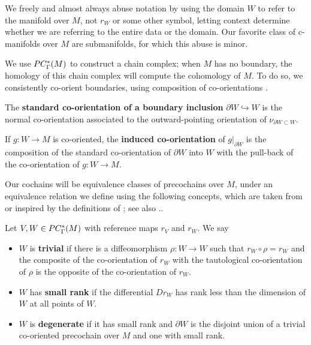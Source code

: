 We freely and almost always abuse notation by using the domain $W$ to refer to the manifold over $M$, not $r_W$ or some other symbol, letting context determine whether we are referring to the entire data or the domain.
Our favorite class of c-manifolds over $M$ are submanifolds, for which this abuse is minor.

We use $PC_\Gamma^*(M)$ to construct a chain complex; when $M$ has no boundary, the homology of this chain complex will compute the cohomology of $M$.
To do so, we consistently co-orient boundaries, using composition of co-orientations \cite[Section 3.3.2]{medina2022foundations}.

\begin{definition}\label{D:boundary co-orientation}
	The {\bf standard co-orientation of a boundary inclusion} $\partial W \hookrightarrow W$ is the normal co-orientation associated to the outward-pointing orientation of $\nu_{\partial W \subset W}$.

	If $g \colon W \to M$ is co-oriented, the {\bf induced co-orientation} of $g|_{\partial W}$ is the composition of the standard co-orientation of $\partial W$ into $W$ with the pull-back of the co-orientation of $g \colon W \to M$.
\end{definition}

Our cochains will be equivalence classes of precochains over $M$, under an equivalence relation we define using the following concepts, which are taken from or inspired by the definitions of \cite{Lipy14}; see also \cite[Section 4.1]{medina2022foundations}..

\begin{definition}\label{D:cman types}
	Let $V, W\in PC_\Gamma^*(M)$ with reference maps $r_V$ and $r_W$.
	We say
	\begin{itemize}
		\item $W$ is \textbf{trivial} if there is a diffeomorphism $\rho \colon W \to W$ such that $r_W \circ \rho = r_W$
		and the composite of the co-orientation of $r_W$ with the tautological co-orientation of $\rho$ is the opposite of the co-orientation of $r_W$.
		\item $W$ has \textbf{small rank} if the differential $D r_W$ has rank less than the dimension of $W$ at all points of $W$.
		\item $W$ is \textbf{degenerate} if it has small rank and ${\partial W}$ is the disjoint union of a trivial co-oriented precochain over $M$ and one with small rank.
	\end{itemize}
\end{definition}

